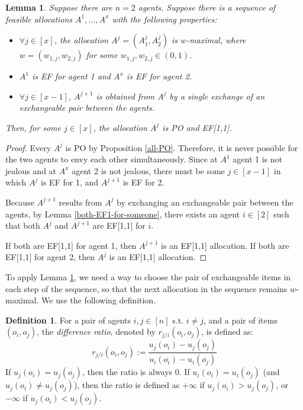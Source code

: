 \documentclass[sigconf]{aamas}
\newtheorem{lemma}[theorem]{Lemma}
\theoremstyle{definition}
\newtheorem{definition}[theorem]{Definition}
\begin{document}
\begin{lemma}
\label{exists-PO-and-EF1}
Suppose there are $n=2$ agents.
Suppose there is a sequence of feasible allocations $A^1,\ldots,A^x$ with the following properties:
\begin{itemize}
\item $\forall j\in[x]$, the allocation $A^j=(A_1^j,A_2^j)$ is $w$-maximal, where $w=(w_{1,j},w_{2,j})$ for some $w_{1,j},w_{2,j}\in(0,1)$.
\item $A^1$ is EF for agent 1 and $A^x$ is EF for agent 2.
\item $\forall j\in[x-1]$, $A^{j+1}$ is obtained from $A^{j}$ by a single exchange of an exchangeable pair between the agents. 
\end{itemize}
Then, for some $j\in[x]$, the allocation $A^j$ is PO and EF[1,1].
\end{lemma}

\begin{proof}
Every $A^j$ is PO by Proposition \ref{all-PO}. 
Therefore, it is never possible for the two agents to envy each other simultaneously.
Since at $A^1$ agent 1 is not jealous and at $A^x$ agent 2 is not jealous, there must be some $j\in [x-1]$ in which $A^{j}$ is EF for 1, and $A^{j+1}$ is EF for 2. 

Because $A^{j+1}$ results from $A^j$ by exchanging an exchangeable pair between the agents, by Lemma \ref{both-EF1-for-someone}, there exists an agent $i \in [2]$ such that both $A^{j}$ and $A^{j+1}$ are EF[1,1] for $i$.

If both are EF[1,1] for agent 1, then $A^{j+1}$ is an EF[1,1] allocation. If both are EF[1,1] for agent 2, then $A^j$ is an EF[1,1] allocation.
\end{proof}

To apply Lemma \ref{exists-PO-and-EF1},
we need a way to choose the pair of exchangeable items in each step of the sequence, so that the next allocation in the sequence remains $w$-maximal.
We use the following definition.

\begin{definition}
\label{diff_ratio_definition}
For a pair of agents $i,j\in [n]$ s.t. $i\neq j$, and a pair of items $(o_i,o_j)$, the \emph{difference ratio}, denoted by $r_{j/i}(o_i,o_j)$, is defined as:
\[
r_{j/i}(o_i,o_j) := \frac{u_j(o_i)-u_j(o_j)}{u_i(o_i)-u_i(o_j)}
\]
If $u_j(o_i)= u_j(o_j)$, then the ratio is always 0.
If $u_i(o_i) = u_i(o_j)$ (and $u_j(o_i) \neq u_j(o_j)$), then the ratio is defined as $+\infty$
if $u_j(o_i)> u_j(o_j)$, or $-\infty$ if $u_j(o_i) < u_j(o_j)$.
\end{definition} 
\end{document}
